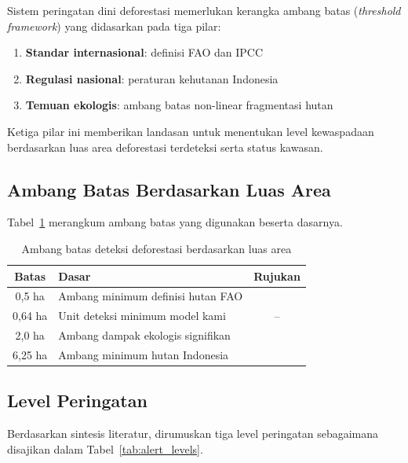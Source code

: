 \documentclass[12pt,a4paper]{article}
\begin{document}
Sistem peringatan dini deforestasi memerlukan kerangka ambang batas
(\textit{threshold framework}) yang didasarkan pada tiga pilar:

\begin{enumerate}[nosep]
    \item \textbf{Standar internasional}: definisi FAO dan IPCC
    \item \textbf{Regulasi nasional}: peraturan kehutanan Indonesia
    \item \textbf{Temuan ekologis}: ambang batas non-linear fragmentasi hutan
\end{enumerate}

Ketiga pilar ini memberikan landasan untuk menentukan level kewaspadaan
berdasarkan luas area deforestasi terdeteksi serta status kawasan.

\subsection{Ambang Batas Berdasarkan Luas Area}

Tabel~\ref{tab:thresholds} merangkum ambang batas yang digunakan beserta
dasarnya.

\begin{table}[H]
\centering
\caption{Ambang batas deteksi deforestasi berdasarkan luas area}
\label{tab:thresholds}
\begin{tabular}{cp{5cm}c}
\toprule
\textbf{Batas} & \textbf{Dasar} & \textbf{Rujukan} \\
\midrule
0,5 ha & Ambang minimum definisi hutan FAO & \cite{fao2020fra} \\
0,64 ha & Unit deteksi minimum model kami & -- \\
2,0 ha & Ambang dampak ekologis signifikan & \cite{xu2026nature} \\
6,25 ha & Ambang minimum hutan Indonesia & \cite{unfccc2022indonesia} \\
\bottomrule
\end{tabular}
\end{table}

\subsection{Level Peringatan}

Berdasarkan sintesis literatur, dirumuskan tiga level peringatan sebagaimana
disajikan dalam Tabel~\ref{tab:alert_levels}.
\end{document}
